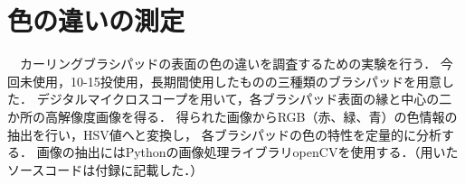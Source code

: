 \documentclass[main]{subfiles}
\begin{document}
\section{色の違いの測定}
　カーリングブラシパッドの表面の色の違いを調査するための実験を行う．
今回未使用，10-15投使用，長期間使用したものの三種類のブラシパッドを用意した．
デジタルマイクロスコープを用いて，各ブラシパッド表面の縁と中心の二か所の高解像度画像を得る．
得られた画像からRGB（赤、緑、青）の色情報の抽出を行い，HSV値へと変換し，
各ブラシパッドの色の特性を定量的に分析する．
画像の抽出にはPythonの画像処理ライブラリopenCVを使用する．（用いたソースコードは付録に記載した．）
\end{document}
